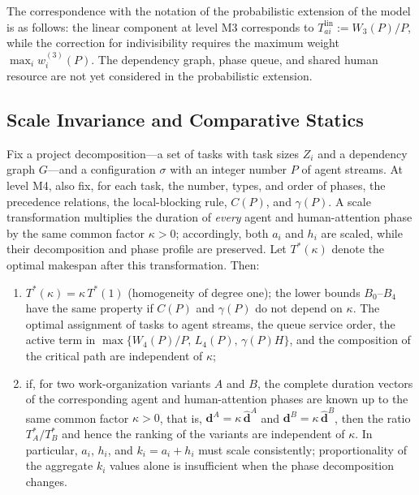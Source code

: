 The correspondence with the notation of the probabilistic extension of the model is as follows: the linear component at level M3 corresponds to $T_{ai}^{\mathrm{lin}}:=W_3(P)/P$, while the correction for indivisibility requires the maximum weight $\max_i w_i^{(3)}(P)$. The dependency graph, phase queue, and shared human resource are not yet considered in the probabilistic extension.

\subsection{Scale Invariance and Comparative Statics}

\begin{proposition}\label{prop:invariance}
Fix a project decomposition---a set of tasks with task sizes $Z_i$ and a
dependency graph $G$---and a configuration $\sigma$ with an integer number $P$ of
agent streams. At level M4, also fix, for each task, the number, types, and order
of phases, the precedence relations, the local-blocking rule, $C(P)$, and
$\gamma(P)$. A scale transformation multiplies the duration of \emph{every}
agent and human-attention phase by the same common factor $\kappa>0$; accordingly,
both $a_i$ and $h_i$ are scaled, while their decomposition and phase profile are
preserved. Let $T^{*}(\kappa)$ denote the optimal makespan after this
transformation. Then:
\begin{enumerate}
  \item $T^{*}(\kappa) = \kappa\, T^{*}(1)$ (homogeneity of degree one); the lower bounds $B_0$--$B_4$ have the same property if $C(P)$ and $\gamma(P)$ do not depend on $\kappa$. The optimal assignment of tasks to agent streams, the queue service order, the active term in $\max\{W_4(P)/P,\,L_4(P),\,\gamma(P)H\}$, and the composition of the critical path are independent of $\kappa$;
  \item if, for two work-organization variants $A$ and $B$, the complete duration vectors of the corresponding agent and human-attention phases are known up to the same common factor $\kappa>0$, that is, $\mathbf d^{A}=\kappa\,\hat{\mathbf d}^{A}$ and $\mathbf d^{B}=\kappa\,\hat{\mathbf d}^{B}$, then the ratio $T^{*}_A/T^{*}_B$ and hence the ranking of the variants are independent of $\kappa$. In particular, $a_i$, $h_i$, and $k_i=a_i+h_i$ must scale consistently; proportionality of the aggregate $k_i$ values alone is insufficient when the phase decomposition changes.
\end{enumerate}
\end{proposition}

